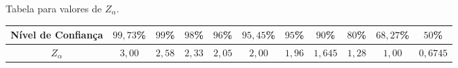 \documentclass[oneside,a4paper,12pt]{article}
\begin{document}
	
	\begin{snugshade}
	\end{snugshade}
	\begin{center}
		Tabela para valores de $Z_{\alpha}$.
		\begin{table}[h]
			\small
			\begin{tabular}{|c|cccccccccc|}
				\hline
				Nível de Confiança	& $99,73$\% & $99$\% & $98$\% & $96$\% & $95,45$\% & $95$\% & $90$\% & $80$\% & $68,27$\% & $50$\% \\ \hline
				$Z_{\alpha}$	& $3,00$ & $2,58$ & $2,33$ & $2,05$ & $2,00$ & $1,96$ & $1,645$ & $1,28$ & $1,00$ & $0,6745$ \\ \hline
			\end{tabular}
		\end{table}
	\end{center}
	\begin{snugshade}
	\end{snugshade}
\end{document}
